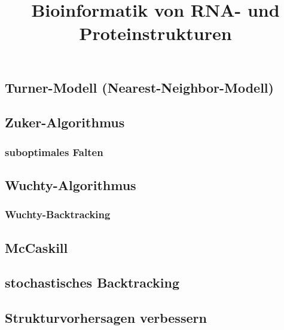 \documentclass[12pt,a4paper]{article}
\title{\Huge\textbf{Bioinformatik von RNA- und Proteinstrukturen}}
\author{}
\date{}
\begin{document}
\begin{titlepage}

\maketitle
\thispagestyle{empty}
\end{titlepage}
\newpage

\begin{titlepage}
\tableofcontents
\thispagestyle{empty}
\end{titlepage}
\newpage



\newpage



\subsection{Turner-Modell (Nearest-Neighbor-Modell)}

\subsection{Zuker-Algorithmus}

\subsubsection{suboptimales Falten}

\subsection{Wuchty-Algorithmus}

\subsubsection{Wuchty-Backtracking}

\subsection{McCaskill}

\subsection{stochastisches Backtracking}

\subsection{Strukturvorhersagen verbessern}
\end{document}
